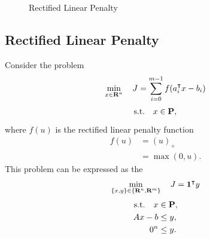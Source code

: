 \documentclass{article}
\begin{document}
    \begin{figure}[b]
        \centering
        \qquad
        \caption{Rectified Linear Penalty}%
        \label{fig:relu}%
    \end{figure}

\subsection{Rectified Linear Penalty}

    Consider the problem
    \begin{align*}
        \min_{x\in\textbf{R}^n}\quad J=\sum_{i=0}^{m-1}f(a_i^\intercal x-b_i)
    \end{align*}
    \begin{align*}
        \text{s.t.}\quad x\in\textbf{P},
    \end{align*}
    where $f(u)$ is the rectified linear penalty function
    \begin{align*}
        f(u)&=(u)_+\\
        &=\max(0,u).
    \end{align*}
    This problem can be expressed as the \LP
    \begin{align*}
        \min_{\{x,y\}\in\{\textbf{R}^n,\textbf{R}^m\}}\quad J=\textbf{1}^\intercal y
    \end{align*}
    \begin{align*}
        \text{s.t.}\quad x &\in \textbf{P},\\
        A x - b &\leq y,\\
        0^n &\leq y.
    \end{align*}
    \\
\end{document}
